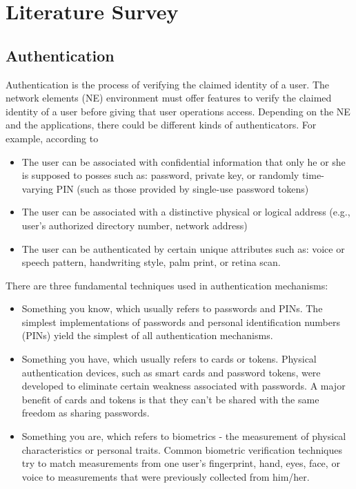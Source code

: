 \documentclass[12pt]{article}			%
\begin{document}
\newpage

\section{Literature Survey }
\subsection{ Authentication }
Authentication is the process of verifying the claimed identity of a user. The network elements (NE) environment must offer features to verify the claimed identity of a user before giving that user operations access. Depending on the NE and the applications, there could be different kinds of authenticators. For example, according to \cite{war02}
\begin{itemize}
\item The user can be associated with confidential information that only he or she is supposed to posses such as: password, private key, or randomly time-varying PIN (such as those provided by single-use password tokens) 
\item The user can be associated with a distinctive physical or logical address (e.g., user’s authorized directory number, network address)
\item The user can be authenticated by certain unique attributes such as: voice or speech pattern, handwriting style, palm print, or retina scan.
\end{itemize}
There are three fundamental techniques used in authentication mechanisms\cite{john03}:
\begin{itemize}
\item Something you know, which usually refers to passwords and PINs. The simplest implementations of passwords and personal identification numbers (PINs) yield the
simplest of all authentication mechanisms.
\item Something you have, which usually refers to cards or tokens. Physical authentication devices, such as smart cards and password tokens, were developed to eliminate certain weakness associated with passwords. A major benefit of cards and tokens is that they can’t be shared with the same freedom as sharing passwords.
\item Something you are, which refers to biometrics - the measurement of physical characteristics or personal traits. Common biometric verification techniques try to match measurements from one user’s fingerprint, hand, eyes, face, or voice to measurements that were previously collected from him/her.
\end{itemize}
\end{document}
